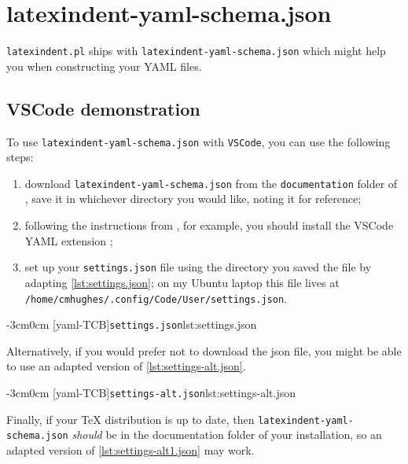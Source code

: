 \documentclass[10pt]{article}
\newenvironment{widepage}{\begin{adjustwidth}{-3cm}{0cm}}{\end{adjustwidth}}
\begin{document}
 \section{latexindent-yaml-schema.json}

  \texttt{latexindent.pl}
   ships with
  \texttt{latexindent-yaml-schema.json}
  which might help you when constructing your YAML files.

 \subsection{VSCode demonstration}
  To use \texttt{latexindent-yaml-schema.json} with \texttt{VSCode}, you can use the
  following steps:  
  \begin{enumerate}
   \item download \texttt{latexindent-yaml-schema.json} from the \texttt{documentation}
         folder of \cite{latexindent-home}, save it in whichever directory you would
         like, noting it for reference;
   \item following the instructions from \cite{vscode-yaml-demo}, for example, you should
         install the VSCode YAML extension \cite{vscode-yaml-extentions};
   \item set up your \texttt{settings.json} file using the directory you saved the file
         by adapting \cref{lst:settings.json}; on my Ubuntu laptop this file lives at
         \texttt{/home/cmhughes/.config/Code/User/settings.json}.
  \end{enumerate}

  \begin{widepage}
   [yaml-TCB]{\texttt{settings.json}}{lst:settings.json}
  \end{widepage}

  Alternatively, if you would prefer not to download the json file, you might be able to
  use an adapted version of \cref{lst:settings-alt.json}.

  \begin{widepage}
   [yaml-TCB]{\texttt{settings-alt.json}}{lst:settings-alt.json}
  \end{widepage}

  Finally, if your TeX distribution is up to date, then
  \texttt{latexindent-yaml-schema.json} \emph{should} be in the documentation folder of
  your installation, so an adapted version of \cref{lst:settings-alt1.json} may work.
\end{document}
